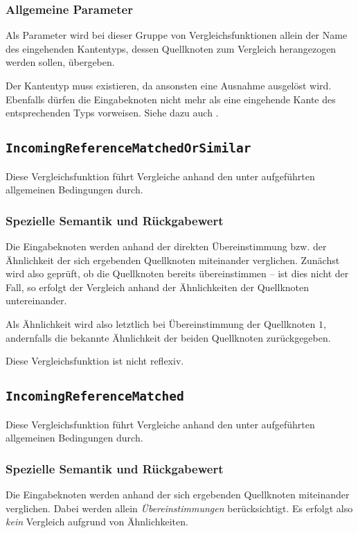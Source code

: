 \subsubsection*{Allgemeine Parameter}
Als Parameter wird bei dieser Gruppe von Vergleichsfunktionen allein der Name des eingehenden Kantentyps, dessen Quellknoten zum Vergleich herangezogen werden sollen, übergeben.

 Der Kantentyp muss existieren, da ansonsten eine Ausnahme ausgelöst wird. Ebenfalls dürfen die Eingabeknoten nicht mehr als eine eingehende Kante des entsprechenden Typs vorweisen. Siehe dazu auch .


\newpage
%
%
\subsection{\texttt{IncomingReferenceMatchedOrSimilar}}
Diese Vergleichsfunktion führt Vergleiche anhand den unter\mylinebreak{} aufgeführten allgemeinen Bedingungen durch.

\subsubsection*{Spezielle Semantik und Rückgabewert}
Die Eingabeknoten werden anhand der direkten Übereinstimmung bzw. der Ähnlichkeit der sich ergebenden Quellknoten miteinander verglichen. Zunächst wird also geprüft, ob die Quellknoten bereits übereinstimmen -- ist dies nicht der Fall, so erfolgt der Vergleich anhand der Ähnlichkeiten der Quellknoten untereinander.

Als Ähnlichkeit wird also letztlich bei Übereinstimmung der Quellknoten $1$, andernfalls die bekannte Ähnlichkeit der beiden Quellknoten zurückgegeben.

 Diese Vergleichsfunktion ist nicht reflexiv.


%
%
\subsection{\texttt{IncomingReferenceMatched}}
Diese Vergleichsfunktion führt Vergleiche anhand den unter\mylinebreak{} aufgeführten allgemeinen Bedingungen durch.

\subsubsection*{Spezielle Semantik und Rückgabewert}
Die Eingabeknoten werden anhand der sich ergebenden Quellknoten miteinander verglichen. Dabei werden allein \emph{Übereinstimmungen} berücksichtigt. Es erfolgt also \emph{kein} Vergleich aufgrund von Ähnlichkeiten.

